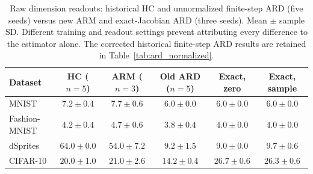 \begin{table}[H]
\caption{Raw dimension readouts: historical HC and unnormalized finite-step ARD (five seeds) versus new ARM and exact-Jacobian ARD (three seeds). Mean $\pm$ sample SD. Different training and readout settings prevent attributing every difference to the estimator alone. The corrected historical finite-step ARD results are retained in Table~\ref{tab:ard_normalized}.}\label{tab:newcounts}
\footnotesize
\setlength{\tabcolsep}{3pt}
\begin{tabular*}{\textwidth}{@{\extracolsep{\fill}}lccccc@{}}
\toprule
Dataset & HC ($n=5$) & ARM ($n=3$) & Old ARD ($n=5$) & Exact, zero & Exact, sample \\
\midrule
MNIST & $7.2 \pm 0.4$ & $7.7 \pm 0.6$ & $6.0 \pm 0.0$ & $6.0 \pm 0.0$ & $6.0 \pm 0.0$ \\
Fashion-MNIST & $4.2 \pm 0.4$ & $4.7 \pm 0.6$ & $3.8 \pm 0.4$ & $4.0 \pm 0.0$ & $4.0 \pm 0.0$ \\
dSprites & $64.0 \pm 0.0$ & $54.0 \pm 7.2$ & $9.2 \pm 1.5$ & $9.0 \pm 0.0$ & $9.7 \pm 0.6$ \\
CIFAR-10 & $20.0 \pm 1.0$ & $21.0 \pm 2.6$ & $14.2 \pm 0.4$ & $26.7 \pm 0.6$ & $26.3 \pm 0.6$ \\
\bottomrule\end{tabular*}
\end{table}
